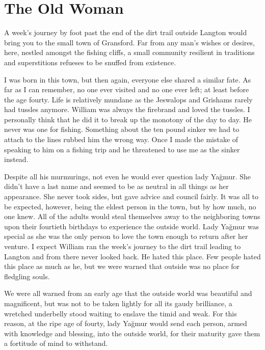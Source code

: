 \chapter*{The Old Woman}


A week's journey by foot past the end of the dirt trail outside Langton would bring you to the small
town of Gransford. Far from any man's wishes or desires, here, nestled amongst the fishing
cliffs, a small community resilient in traditions and superstitions refueses to be snuffed from
existence.

I was born in this town, but then again, everyone else shared a similar fate. As far as I can
remember, no one ever visited and no one ever left; at least before the age fourty. Life is
relatively mundane as the Jeswalops and Grishams rarely had tussles anymore. William was always the
firebrand and loved the tussles. I personally think that he did it to break up the monotony of the
day to day. He never was one for fishing. Something about the ten pound sinker we had to attach
to the lines rubbed him the wrong way. Once I made the mistake of speaking to him on a fishing trip
and he threatened to use me as the sinker instead.

Despite all his murmurings, not even he would ever question lady Yağmur. She didn't have a last name
and seemed to be as neutral in all things as her appearance. She never took sides, but gave advice
and council fairly. It was all to be expected, however, being the eldest person in the town, but by
how much, no one knew. All of the adults would steal themselves away to the neighboring towns upon
their fourtieth birthdays to experience the outside world. Lady Yağmur was special as she was the
only person to love the town enough to return after her venture. I expect William ran the week's
journey to the dirt trail leading to Langton and from there never looked back. He hated this place.
Few people hated this place as much as he, but we were warned that outside was no place for
fledgling souls.

We were all warned from an early age that the outside world was beautiful and magnificent, but was
not to be taken lightly for all its gaudy brilliance, a wretched underbelly stood waiting to enslave
the timid and weak. For this reason, at the ripe age of fourty, lady Yağmur would send each person,
armed with knowledge and blessing, into the outside world, for their maturity gave them a fortitude
of mind to withstand.

